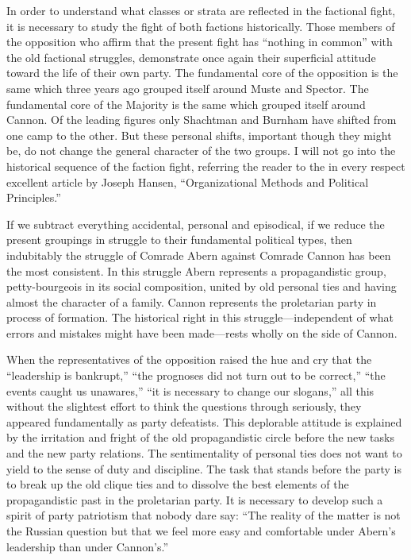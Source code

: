 In order to understand what classes or strata are reflected in the factional fight, it is necessary to study the fight of both factions historically. Those members of the opposition who affirm that the present fight has “nothing in common” with the old factional struggles, demonstrate once again their superficial attitude toward the life of their own party. The fundamental core of the opposition is the same which three years ago grouped itself around Muste and Spector. The fundamental core of the Majority is the same which grouped itself around Cannon. Of the leading figures only Shachtman and Burnham have shifted from one camp to the other. But these personal shifts, important though they might be, do not change the general character of the two groups. I will not go into the historical sequence of the faction fight, referring the reader to the in every respect excellent article by Joseph Hansen, ``Organizational Methods and Political Principles.''

If we subtract everything accidental, personal and episodical, if we reduce the present groupings in struggle to their fundamental political types, then indubitably the struggle of Comrade Abern against Comrade Cannon has been the most consistent. In this struggle Abern represents a propagandistic group, petty-bourgeois in its social composition, united by old personal ties and having almost the character of a family. Cannon represents the proletarian party in process of formation. The historical right in this struggle---independent of what errors and mistakes might have been made---rests wholly on the side of Cannon.

When the representatives of the opposition raised the hue and cry that the “leadership is bankrupt,” “the prognoses did not turn out to be correct,” “the events caught us unawares,” “it is necessary to change our slogans,” all this without the slightest effort to think the questions through seriously, they appeared fundamentally as party defeatists. This deplorable attitude is explained by the irritation and fright of the old propagandistic circle before the new tasks and the new party relations. The sentimentality of personal ties does not want to yield to the sense of duty and discipline. The task that stands before the party is to break up the old clique ties and to dissolve the best elements of the propagandistic past in the proletarian party. It is necessary to develop such a spirit of party patriotism that nobody dare say: “The reality of the matter is not the Russian question but that we feel more easy and comfortable under Abern’s leadership than under Cannon’s.”

